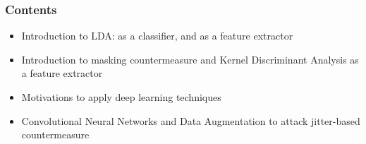 \begin{frame}
\frametitle{Contents}
\begin{itemize}
\item Introduction to LDA: as a classifier, and as a feature extractor
\item Introduction to masking countermeasure and Kernel Discriminant Analysis as a feature extractor
\item Motivations to apply deep learning techniques
\item Convolutional Neural Networks and Data Augmentation to attack jitter-based countermeasure
\end{itemize}
\end{frame}






%
%
